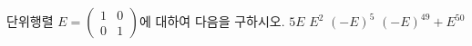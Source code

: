 \hspace*{2mm}\begin{minipage}[t]{\dimexpr\linewidth-2mm\relax}\vspace{0pt}
단위행렬 $E=\begin{pmatrix} 1 & 0 \\ 0 & 1 \end{pmatrix}$에 대하여 다음을 구하시오.
 $5E$
 $E^2$
 $(-E)^5$
 $(-E)^{49}+E^{50}$\end{minipage}
